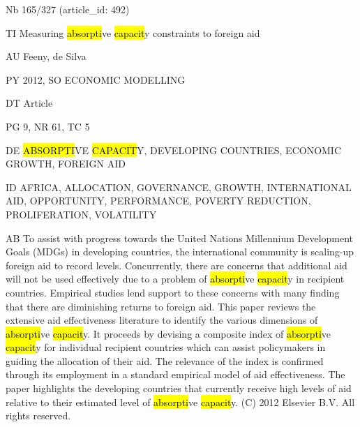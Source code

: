 \documentclass[a4paper]{article}
\begin{document}
\vspace*{-2cm}
Nb \tabto{0cm}165/327 (article\_id: 492)\par
TI \tabto{0cm}Measuring \hl{absorpti}ve \hl{capacit}y constraints to foreign aid\par
AU \tabto{0cm}Feeny, de Silva\par
PY \tabto{0cm}2012, SO ECONOMIC MODELLING\par
DT \tabto{0cm}Article\par
PG \tabto{0cm}9, NR 61, TC 5\par
DE \tabto{0cm}\hl{ABSORPTI}VE \hl{CAPACIT}Y, DEVELOPING COUNTRIES, ECONOMIC GROWTH, FOREIGN AID\par
ID \tabto{0cm}AFRICA, ALLOCATION, GOVERNANCE, GROWTH, INTERNATIONAL AID, OPPORTUNITY, PERFORMANCE, POVERTY REDUCTION, PROLIFERATION, VOLATILITY\par
AB \tabto{0cm}To assist with progress towards the United Nations Millennium Development Goals (MDGs) in developing countries, the international community is scaling-up foreign aid to record levels. Concurrently, there are concerns that additional aid will not be used effectively due to a problem of \hl{absorpti}ve \hl{capacit}y in recipient countries. Empirical studies lend support to these concerns with many finding that there are diminishing returns to foreign aid. This paper reviews the extensive aid effectiveness literature to identify the various dimensions of \hl{absorpti}ve \hl{capacit}y. It proceeds by devising a composite index of \hl{absorpti}ve \hl{capacit}y for individual recipient countries which can assist policymakers in guiding the allocation of their aid. The relevance of the index is confirmed through its employment in a standard empirical model of aid effectiveness. The paper highlights the developing countries that currently receive high levels of aid relative to their estimated level of \hl{absorpti}ve \hl{capacit}y. (C) 2012 Elsevier B.V. All rights reserved.\par
\clearpage
\end{document}
